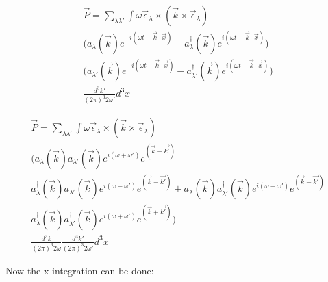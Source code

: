 \documentclass[a4]{article}
\begin{document}
    \begin{equation}
        \begin{aligned}
            \vec{P} = \sum_{\lambda \lambda'} \int \omega \vec{\epsilon}_{\lambda} \times (\vec{k} \times \vec{\epsilon}_{\lambda}) \\
            \big( a_{\lambda} (\vec{k}) e^{- i (\omega t - \vec{k} \cdot \vec{x})} - a_{\lambda}^{\dagger} (\vec{k}) e^{i (\omega t - \vec{k} \cdot \vec{x})} \big) \\
            \big( a_{\lambda'} (\vec{k}) e^{- i (\omega t - \vec{k} \cdot \vec{x})} - a_{\lambda'}^{\dagger} (\vec{k}) e^{i (\omega t - \vec{k} \cdot \vec{x})} \big) \\
            \frac{d^{3} k'}{(2 \pi)^{3} 2 \omega'} d^{3} x
        \end{aligned}
    \end{equation}

    \begin{equation}
        \begin{aligned}
            \vec{P} = \sum_{\lambda \lambda'} \int \omega \vec{\epsilon}_{\lambda} \times (\vec{k} \times \vec{\epsilon}_{\lambda}) \\
            \big( a_{\lambda} (\vec{k}) a_{\lambda'} (\vec{k}) e^{i (\omega + \omega')} e^{(\vec{k} + \vec{k'})} \\
            a^{\dagger}_{\lambda} (\vec{k}) a_{\lambda'} (\vec{k}) e^{i (\omega - \omega')} e^{(\vec{k} - \vec{k'})} + a_{\lambda} (\vec{k}) a^{\dagger}_{\lambda'} (\vec{k}) e^{i (\omega - \omega')} e^{(\vec{k} - \vec{k'})} \\
            a^{\dagger}_{\lambda} (\vec{k}) a^{\dagger}_{\lambda'} (\vec{k}) e^{i (\omega + \omega')} e^{(\vec{k} + \vec{k'})} \big)\\
            \frac{d^{3} k}{(2 \pi)^{3} 2 \omega} \frac{d^{3} k'}{(2 \pi)^{3} 2 \omega'} d^{3} x
        \end{aligned}
    \end{equation}

    Now the x integration can be done:
\end{document}
